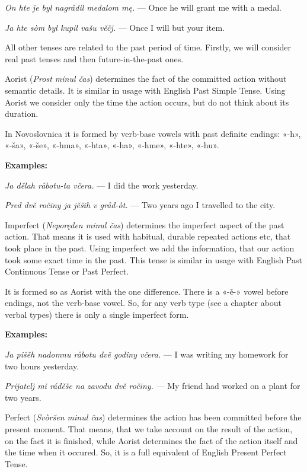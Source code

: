 \textit{On hte je byl nagrådil medalom mę.} — Once he will grant me with a medal.

\textit{Ja hte sòm byl kupil vašu věčj.} — Once I will but your item.

All other tenses are related to the past period of time. Firstly, we will consider real past tenses and then future-in-the-past ones.

Aorist (\textit{Prost minul čas}) determines the fact of the committed action without semantic details. It is similar in usage with English Past Simple Tense. Using Aorist we consider only the time the action occurs, but do not think about its duration.

In Novoslovnica it is formed by verb-base vowels with past definite endings: «-h», «-ša», «-še», «-hma», «-hta», «-ha», «-hme», «-hte», «-hu».

\textbf{Examples:}

\textit{Ja dělah råbotu-ta včera.} — I did the work yesterday.

\textit{Pred dvě ročiny ja jěŝih v gråd-òt.} — Two years ago I travelled to the city.

Imperfect (\textit{Neporęden minul čas}) determines the imperfect aspect of the past action. That means it is used with habitual, durable repeated actions etc, that took place in the past. Using imperfect we add the information, that our action took some exact time in the past. This tense is similar in usage with English Past Continuous Tense or Past Perfect.

It is formed so as Aorist with the one difference. There is a «-ě-» vowel before endings, not the verb-base vowel. So, for any verb type (see a chapter about verbal types) there is only a single imperfect form.

\textbf{Examples:}

\textit{Ja pišěh nadomnu råbotu dvě godiny včera.} — I was writing my homework for two hours yesterday.

\textit{Prijatelj mi ráděše na zavodu dvě ročiny.} — My friend had worked on a plant for two years.

Perfect (\textit{Svòršen minul čas}) determines the action has been committed before the present moment. That means, that we take account on the result of the action, on the fact it is finished, while Aorist determines the fact of the action itself and the time when it occured. So, it is a full equivalent of English Present Perfect Tense.

